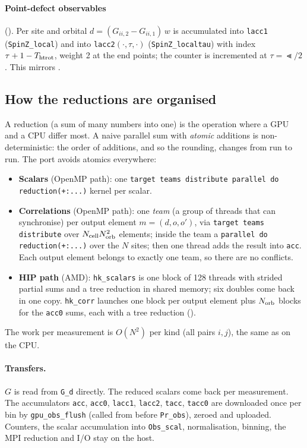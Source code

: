 \paragraph{Point-defect observables} (). Per site and orbital $d=(G_{ii,2}-G_{ii,1})\,w$ is accumulated into \texttt{lacc1} (\texttt{SpinZ\_local}) and into \texttt{lacc2}$(\cdot,\tau,\cdot)$ (\texttt{SpinZ\_localtau}) with index $\tau+1-T_{\rm htrot}$, weight 2 at the end points; the counter is incremented at $\tau=\Lt/2$. This mirrors .

\subsection{How the reductions are organised}

A reduction (a sum of many numbers into one) is the operation where a GPU and a CPU differ most. A naive parallel sum with \emph{atomic} additions is non-deterministic: the order of additions, and so the rounding, changes from run to run. The port avoids atomics everywhere:
\begin{itemize}
\item \textbf{Scalars} (OpenMP path): one \texttt{target teams distribute parallel do reduction(+:...)} kernel per scalar.
\item \textbf{Correlations} (OpenMP path): one \emph{team} (a group of threads that can synchronise) per output element $m=(d,o,o')$, via \texttt{target teams distribute} over $N_{\rm cell}N_{\rm orb}^2$ elements; inside the team a \texttt{parallel do reduction(+:...)} over the $N$ sites; then one thread adds the result into \texttt{acc}. Each output element belongs to exactly one team, so there are no conflicts.
\item \textbf{HIP path} (AMD): \texttt{hk\_scalars} is one block of 128 threads with strided partial sums and a tree reduction in shared memory; six doubles come back in one copy. \texttt{hk\_corr} launches one block per output element plus $N_{\rm orb}$ blocks for the \texttt{acc0} sums, each with a tree reduction ().
\end{itemize}
The work per measurement is $O(N^2)$ per kind (all pairs $i,j$), the same as on the CPU.

\paragraph{Transfers.} $G$ is read from \texttt{G\_d} directly. The reduced scalars come back per measurement. The accumulators \texttt{acc}, \texttt{acc0}, \texttt{lacc1}, \texttt{lacc2}, \texttt{tacc}, \texttt{tacc0} are downloaded once per bin by \texttt{gpu\_obs\_flush} (called from  before \texttt{Pr\_obs}), zeroed and uploaded. Counters, the scalar accumulation into \texttt{Obs\_scal}, normalisation, binning, the MPI reduction and I/O stay on the host.

